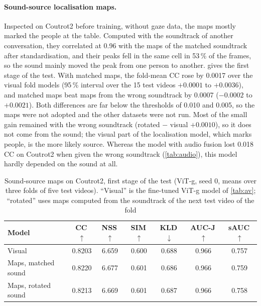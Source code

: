 \paragraph{Sound-source localisation maps.} Inspected on Coutrot2 before
training, without gaze data, the maps mostly marked the people at the table.
Computed with the soundtrack of another conversation, they correlated at 0.96
with the maps of the matched soundtrack after standardisation, and their peaks
fell in the same cell in 53\,\% of the frames, so the sound mainly moved the
peak from one person to another.  gives the first stage of the
test. With matched maps, the fold-mean \acrshort{CC} rose by 0.0017 over the
visual fold models (95\,\% interval over the 15 test videos $+0.0001$ to
$+0.0036$), and matched maps beat maps from the wrong soundtrack by 0.0007
($-0.0002$ to $+0.0021$). Both differences are far below the thresholds of
0.010 and 0.005, so the maps were not adopted and the other datasets were not
run. Most of the small gain remained with the wrong soundtrack (rotated $-$
visual $+0.0010$), so it does not come from the sound; the visual part of the
localisation model, which marks people, is the more likely source. Whereas the
model with audio fusion lost 0.018 \acrshort{CC} on Coutrot2 when given the wrong
soundtrack (\cref{tab:audio}), this model hardly depended on the sound at all.

\begin{table}[htbp]
  \centering
  \caption{Sound-source maps on Coutrot2, first stage of the test
  (\acrshort{ViT}-g, seed 0, means over three folds of five test videos).
  \enquote{Visual} is the fine-tuned \acrshort{ViT}-g model of \cref{tab:av};
  \enquote{rotated} uses maps computed from the soundtrack of the next test video
  of the fold}\label{tab:ssl}
  \footnotesize
  \begin{tabular}{@{}lcccccc@{}}
    \toprule
    \textbf{Model} & \textbf{\acrshort{CC}}\,$\uparrow$ & \textbf{\acrshort{NSS}}\,$\uparrow$
      & \textbf{\acrshort{SIM}}\,$\uparrow$ & \textbf{\acrshort{KLD}}\,$\downarrow$
      & \textbf{\acrshort{AUC-J}}\,$\uparrow$ & \textbf{\acrshort{sAUC}}\,$\uparrow$ \\
    \midrule
    Visual               & 0.8203 & 6.659 & 0.600 & 0.688 & 0.966 & 0.757 \\
    Maps, matched sound  & 0.8220 & 6.677 & 0.601 & 0.686 & 0.966 & 0.759 \\
    Maps, rotated sound  & 0.8213 & 6.669 & 0.601 & 0.687 & 0.966 & 0.758 \\
    \bottomrule
  \end{tabular}
\end{table}

